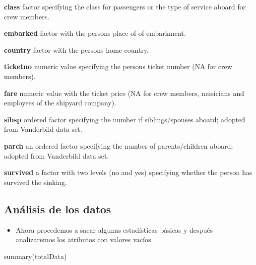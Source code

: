 \documentclass[
]{article}
\newenvironment{Shaded}{\begin{snugshade}}{\end{snugshade}}
\newcommand{\FunctionTok}[1]{\textcolor[rgb]{0.94,0.94,0.56}{#1}}
\newcommand{\NormalTok}[1]{\textcolor[rgb]{0.80,0.80,0.80}{#1}}
\providecommand{\tightlist}{%
  \setlength{\itemsep}{0pt}\setlength{\parskip}{0pt}}
\begin{document}
\textbf{class} factor specifying the class for passengers or the type of
service aboard for crew members.

\textbf{embarked} factor with the persons place of of embarkment.

\textbf{country} factor with the persons home country.

\textbf{ticketno} numeric value specifying the persons ticket number (NA
for crew members).

\textbf{fare} numeric value with the ticket price (NA for crew members,
musicians and employees of the shipyard company).

\textbf{sibsp} ordered factor specifying the number if siblings/spouses
aboard; adopted from Vanderbild data set.

\textbf{parch} an ordered factor specifying the number of
parents/children aboard; adopted from Vanderbild data set.

\textbf{survived} a factor with two levels (no and yes) specifying
whether the person has survived the sinking.

\hypertarget{anuxe1lisis-de-los-datos}{%
\subsection{Análisis de los datos}\label{anuxe1lisis-de-los-datos}}

\begin{itemize}
\tightlist
\item
  Ahora procedemos a sacar algunas estadísticas básicas y después
  analizaremos los atributos con valores vacíos.
\end{itemize}

\begin{Shaded}
\begin{Highlighting}[]
\FunctionTok{summary}\NormalTok{(totalData)}
\end{Highlighting}
\end{Shaded}
\end{document}
